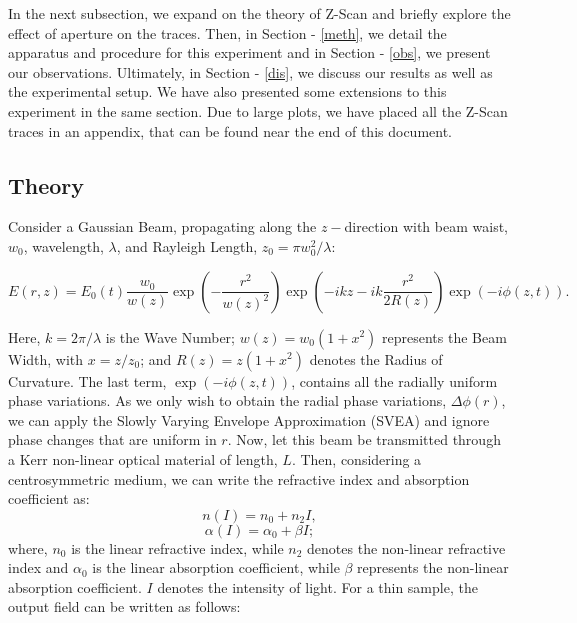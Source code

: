 \documentclass[%
 reprint,
amsmath,
amssymb,
10pt
]{revtex4-2}
\begin{document}
In the next subsection, we expand on the theory of Z-Scan and briefly explore the effect of aperture on the traces. Then, in Section - \ref{meth}, we detail the apparatus and procedure for this experiment and in Section - \ref{obs}, we present our observations. Ultimately, in Section - \ref{dis}, we discuss our results as well as the experimental setup. We have also presented some extensions to this experiment in the same section. Due to large plots, we have placed all the Z-Scan traces in an appendix, that can be found near the end of this document.

\subsection{\label{th}Theory}
Consider a Gaussian Beam, propagating along the $z-$direction with beam waist, $w_0$, wavelength, $\lambda$, and Rayleigh Length, $z_0 = \pi w_0^2 / \lambda$:
\begin{widetext}
\begin{equation}
    \boxed{
    E(r, z) = E_0(t)\frac{w_0}{w(z)}\exp{\left(-\frac{r^2}{w(z)^2}\right)}\exp{\left(-ikz -ik\frac{r^2}{2R(z)}\right)}\exp(-i\phi(z,t))
    }.
    \label{eq:E}
\end{equation}
\end{widetext}
Here, $k = 2\pi / \lambda$ is the Wave Number; $w(z) = w_0(1 + x^2)$ represents the Beam Width, with $x = z / z_0$; and $R(z) = z(1 + x^2)$ denotes the Radius of Curvature. The last term, $\exp(-i\phi(z,t))$, contains all the radially uniform phase variations. As we only wish to obtain the radial phase variations, $\Delta\phi(r)$, we can apply the Slowly Varying Envelope Approximation (SVEA) and ignore phase changes that are uniform in $r$. Now, let this beam be transmitted through a Kerr non-linear optical material of length, $L$. Then, considering a centrosymmetric medium, we can write the refractive index and absorption coefficient as:
\begin{equation}
    n(I) = n_0 + n_2 I,
    \label{eq:n}
\end{equation}
\begin{equation}
    \alpha(I) = \alpha_0 + \beta I;
    \label{eq:alpha}
\end{equation}
where, $n_0$ is the linear refractive index, while $n_2$ denotes the non-linear refractive index and $\alpha_0$ is the linear absorption coefficient, while $\beta$ represents the non-linear absorption coefficient. $I$ denotes the intensity of light. For a thin sample, the output field can be written as follows:
\end{document}
